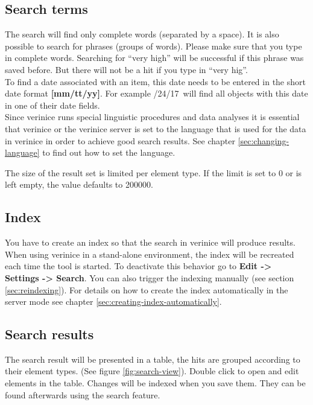 \documentclass[a4paper,10pt]{book}
\begin{document}
\subsection{Search terms}
\label{sec:search-terms}

The search will find only complete words (separated by a space). It is
also possible to search for phrases (groups of words). Please make
sure that you type in complete words. Searching for ``very high'' will
be successful if this phrase was saved before. But there will not
be a hit if you type in ``very hig''.\\

To find a date associated with an item, this date needs to be entered 
in the short date format \textbf{[mm/tt/yy]}.
For example /24/17\grqq\ will find all objects with this
date in one of their date fields.\\

Since verinice runs special linguistic procedures and data analyses it
is essential that verinice or the verinice server is set to the
language that is used for the data in verinice in order to achieve
good search results. See chapter \ref{sec:changing-language} to find
out how to set the language.

The size of the result set is limited per element type. If the limit
is set to 0 or is left empty, the value defaults to 200000.
\subsection{Index}
\label{sec:index}

You have to create an index so that the search in verinice will
produce results.  When using verinice in a stand-alone environment,
the index will be recreated each time the tool is started. To
deactivate this behavior go to \textbf{Edit -> Settings ->
  Search}. You can also trigger the indexing manually (see section
\ref{sec:reindexing}). For details on how to create the index
automatically in the server mode see
chapter \ref{sec:creating-index-automatically}.

\subsection{Search results}
\label{sec:search-results}

The search result will be presented in a table, the hits are grouped
according to their element types. (See figure
\ref{fig:search-view}). Double click to open and edit elements in the
table. Changes will be indexed when you save them. They can be found
afterwards using the search feature.\\
\end{document}
